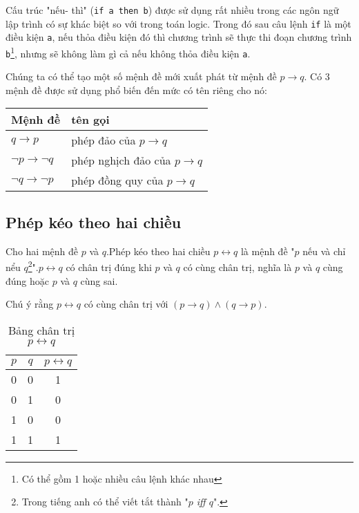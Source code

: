 \documentclass[11pt,fleqn]{book} %
\begin{document}
        Cấu trúc "nếu- thì" (\texttt{if a then b}) được sử dụng rất nhiều trong các ngôn ngữ lập trình có sự khác biệt so với trong toán logic. Trong đó sau câu lệnh \texttt{if} là một điều kiện \texttt{a}, nếu thỏa điều kiện đó thì chương trình sẽ thực thi đoạn chương trình \texttt{b}\footnote{Có thể gồm 1 hoặc nhiều câu lệnh khác nhau}, nhưng sẽ không làm gì cả nếu không thỏa điều kiện \texttt{a}.
        
        Chúng ta có thể tạo một số mệnh đề mới xuất phát từ mệnh đề $p \to q$. Có 3 mệnh đề được sử dụng phổ biến đến mức có tên riêng cho nó:
        \begin{table}[h!]
            \centering
            \setlength{\tabcolsep}{18pt}
            \begin{tabular}{l l}
                Mệnh đề & tên gọi\\ \hline
                $q \to p$ & phép đảo của $p \to q$\\
                $\neg p \to \neg q$ & phép nghịch đảo của $p \to q$\\
                $\neg q \to \neg p$ & phép đồng quy của $p \to q$
            \end{tabular}
        \end{table}
    \subsection{Phép kéo theo hai chiều} 
        \begin{definition}
            Cho hai mệnh đề $p$ và $q$.Phép kéo theo hai chiều $p \leftrightarrow q$ là mệnh đề "$p$ nếu và chỉ nểu $q$\footnote{
                Trong tiếng anh có thể viết tắt thành "\textit{$p$ iff $q$}".
            }".$p \leftrightarrow q$ có chân trị đúng khi $p$ và $q$ có cùng chân trị, nghĩa là $p$ và $q$ cùng đúng hoặc $p$ và $q$ cùng sai.
            
            Chú ý rằng $p \leftrightarrow q$ có cùng chân trị với $(p \to q) \land (q \to p)$.
        \end{definition}
        \begin{table}[h!]
            \centering
            \setlength{\tabcolsep}{18pt}
            \begin{tabular}{c c c}
                $p$ & $q$ & $p \leftrightarrow q$ \\ \hline
                0 & 0 & 1\\ 
                0 & 1 & 0\\
                1 & 0 & 0\\
                1 & 1 & 1
            \end{tabular}
            \caption{Bảng chân trị $p \leftrightarrow q$}
        \end{table}
        
\end{document}
